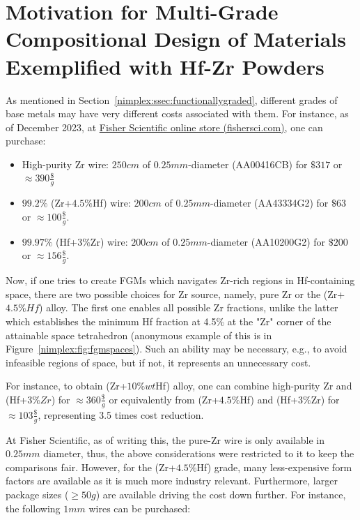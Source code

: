 \section{Motivation for Multi-Grade Compositional Design of Materials Exemplified with Hf-Zr Powders} \label{nimplex:app1}

As mentioned in Section~\ref{nimplex:ssec:functionallygraded}, different grades of base metals may have very different costs associated with them. For instance, as of December 2023, at \href{https://www.fishersci.com}{Fisher Scientific online store (fishersci.com)}, one can purchase:
\begin{itemize}
    \item High-purity Zr wire: $250cm$ of $0.25mm$-diameter (AA00416CB) for $\$317$ or $\approx 390\frac{\$}{g}$
    \item $99.2\%$ (Zr+$4.5\%$Hf) wire: $200cm$ of $0.25mm$-diameter (AA43334G2) for $\$63$ or $\approx 100\frac{\$}{g}$. 
    \item $99.97\%$ (Hf+$3\%$Zr) wire: $200cm$ of $0.25mm$-diameter (AA10200G2) for $\$200$ or $\approx 156\frac{\$}{g}$. 
\end{itemize} 

Now, if one tries to create FGMs which navigates Zr-rich regions in Hf-containing space, there are two possible choices for Zr source, namely, pure Zr or the (Zr+$4.5\%Hf$) alloy. The first one enables all possible Zr fractions, unlike the latter which establishes the minimum Hf fraction at 4.5\% at the "Zr" corner of the attainable space tetrahedron (anonymous example of this is in Figure~\ref{nimplex:fig:fgmspaces}). Such an ability may be necessary, e.g., to avoid infeasible regions of space, but if not, it represents an unnecessary cost. 

For instance, to obtain (Zr+$10\%wt$Hf) alloy, one can combine high-purity Zr and (Hf+$3\%Zr$) for $\approx 360\frac{\$}{g}$ or equivalently from (Zr+$4.5\%$Hf) and (Hf+$3\%$Zr) for $\approx 103\frac{\$}{g}$, representing 3.5 times cost reduction.

At Fisher Scientific, as of writing this, the pure-Zr wire is only available in $0.25mm$ diameter, thus, the above considerations were restricted to it to keep the comparisons fair. However, for the (Zr+$4.5\%$Hf) grade, many less-expensive form factors are available as it is much more industry relevant. Furthermore, larger package sizes ($\geq50g$) are available driving the cost down further. For instance, the following $1mm$ wires can be purchased:

